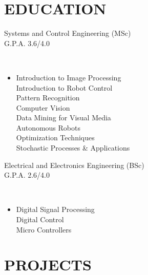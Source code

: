 \documentclass[margin]{res}
\begin{document}
\begin{resume}
		\sectionspace
		\section{EDUCATION}
		{Systems and Control Engineering (MSc)\\G.P.A. 3.6/4.0}

		\hspace{.08in}{\bf Subjects}\vspace{-.15in}\\
		\begin{itemize}
			\item[] Introduction to Image Processing \\
			Introduction to Robot Control\\
			Pattern Recognition \\
			Computer Vision \\
			Data Mining for Visual Media \\
			Autonomous Robots \\
			Optimization Techniques \\
			Stochastic Processes \& Applications
		\end{itemize}
		
		{Electrical and Electronics Engineering (BSc)\\G.P.A. 2.6/4.0}

		\hspace{.08in}{\bf Subjects}\vspace{-.15in}\\
		\begin{itemize}
			\item[] Digital Signal Processing \\
			Digital Control \\
			Micro Controllers
		\end{itemize}
		
		\vspace{1in}
		\section{PROJECTS}

\end{resume}
\end{document}
